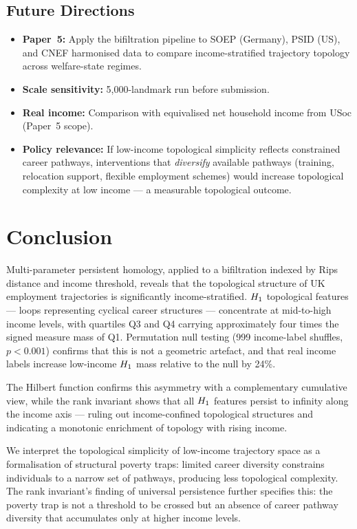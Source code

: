 \subsection{Future Directions}

\begin{itemize}
  \item \textbf{Paper~5:} Apply the bifiltration pipeline to SOEP (Germany),
    PSID (US), and CNEF harmonised data to compare income-stratified
    trajectory topology across welfare-state regimes.
  \item \textbf{Scale sensitivity:} 5,000-landmark run before submission.
  \item \textbf{Real income:} Comparison with equivalised net household
    income from USoc (Paper~5 scope).
  \item \textbf{Policy relevance:} If low-income topological simplicity
    reflects constrained career pathways, interventions that \emph{diversify}
    available pathways (training, relocation support, flexible employment
    schemes) would increase topological complexity at low income --- a
    measurable topological outcome.
\end{itemize}

\section{Conclusion}
\label{sec:conclusion}

Multi-parameter persistent homology, applied to a bifiltration indexed by
Rips distance and income threshold, reveals that the topological structure of
UK employment trajectories is significantly income-stratified. $H_{1}$
topological features --- loops representing cyclical career structures ---
concentrate at mid-to-high income levels, with quartiles Q3 and Q4 carrying
approximately four times the signed measure mass of Q1. Permutation null
testing (999 income-label shuffles, $p < 0.001$) confirms that this is not a
geometric artefact, and that real income labels increase low-income $H_{1}$
mass relative to the null by 24\%.

The Hilbert function confirms this asymmetry with a complementary cumulative
view, while the rank invariant shows that all $H_{1}$ features persist to
infinity along the income axis --- ruling out income-confined topological
structures and indicating a monotonic enrichment of topology with rising
income.

We interpret the topological simplicity of low-income trajectory space as a
formalisation of structural poverty traps: limited career diversity
constrains individuals to a narrow set of pathways, producing less
topological complexity. The rank invariant's finding of universal persistence
further specifies this: the poverty trap is not a threshold to be crossed but
an absence of career pathway diversity that accumulates only at higher income
levels.

